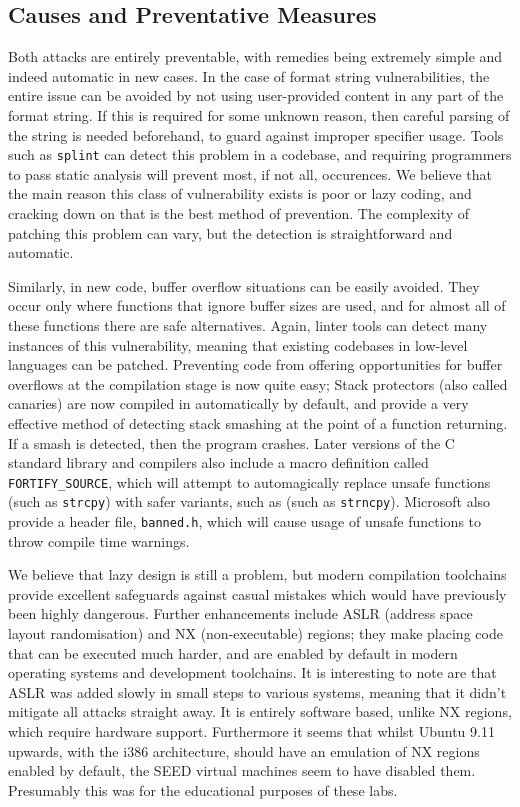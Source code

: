 \subsection{Causes and Preventative Measures}
Both attacks are entirely preventable, with remedies being extremely simple and indeed automatic in new cases.
In the case of format string vulnerabilities, the entire issue can be avoided by not using user-provided content in
any part of the format string. If this is required for some unknown reason, then careful parsing of the string 
is needed beforehand, to guard against improper specifier usage. Tools such as {\tt splint} can detect 
this problem in a codebase\cite{splint_art}, and requiring programmers to pass static analysis will prevent most,
if not all, occurences. We believe that the main reason this class of vulnerability exists is poor or lazy
coding, and cracking down on that is the best method of prevention. The complexity of patching this problem can vary,
but the detection is straightforward and automatic.

Similarly, in new code, buffer overflow situations can be easily avoided. They occur only where functions that ignore
buffer sizes are used, and for almost all of these functions there are safe alternatives. Again, linter tools can
detect many instances of this vulnerability, meaning that existing codebases in low-level languages can be patched.
Preventing code from offering opportunities for buffer overflows at the compilation stage is now quite easy; 
Stack protectors (also called canaries) are now compiled in automatically by default, and provide a very effective
method of detecting stack smashing at the point of a function returning. If a smash is detected, then the program crashes.
Later versions of the C standard library and compilers also include a macro definition called {\tt FORTIFY\_SOURCE},
which will attempt to automagically replace unsafe functions (such as {\tt strcpy}) with safer variants, such as 
(such as {\tt strncpy})\cite{fort_source}. Microsoft also provide a header file, {\tt banned.h}, which will cause
usage of unsafe functions to throw compile time warnings\cite{banned}.

We believe that lazy design is still a problem, but modern compilation toolchains provide excellent safeguards against
casual mistakes which would have previously been highly dangerous. Further enhancements include ASLR (address space
layout randomisation) and NX (non-executable) regions; they make placing code that can be executed much harder,
and are enabled by default in modern operating systems and development toolchains\cite{wiki_aslr}\cite{wiki_nx}.
It is interesting to note are that ASLR was added slowly in small steps to various systems, meaning that it didn't
mitigate all attacks straight away. It is entirely software based, unlike NX regions, which require hardware support.
Furthermore it seems that whilst Ubuntu 9.11 upwards, with the i386 architecture, should have an emulation of NX regions
enabled by default\cite{nx_bit}, the SEED virtual machines seem to have disabled them. 
Presumably this was for the educational purposes of these labs.

